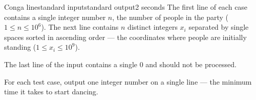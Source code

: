 \begin{problem}{Conga line}{standard input}{standard output}{2 seconds}
The first line of each case contains a single integer number $n$, the number of people in the party ($1 \le n \le 10^6 $).
The next line contains $n$ distinct integers $x_i$ separated by single spaces sorted in ascending order --- the coordinates where people are initially standing 
($1 \le x_i \le 10^9$).

The last line of the input contains a single $0$ and should not be processed.

\OutputFile

For each test case, output one integer number on a single line --- the minimum time it takes to start dancing.

\Example

\begin{example}
%
\end{example}

\end{problem}
